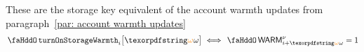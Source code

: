 \label{par: storage key warmth updates} These are the storage key equivalent of the account warmth updates from paragraph~\ref{par: account warmth updates}
\[
	\stoTurnOnWarmth
	{i}{\relof}
	\iff \stoWarmth\new _{i + \relof} = 1
\]
